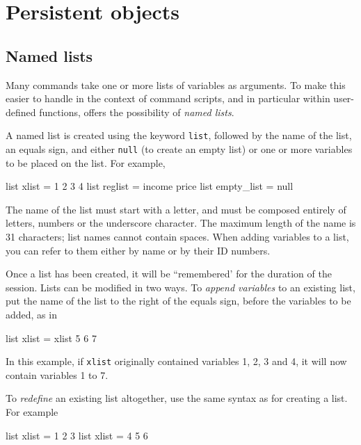 \chapter{Persistent objects}
\label{persist}


\section{Named lists}
\label{named-lists}

Many  commands take one or more lists of variables as
arguments.  To make this easier to handle in the context of command
scripts, and in particular within user-defined functions, 
offers the possibility of \textit{named lists}.  

A named list is created using the keyword \texttt{list}, followed by
the name of the list, an equals sign, and either \texttt{null} (to
create an empty list) or one or more variables to be placed on the
list.  For example,

\begin{code}
list xlist = 1 2 3 4
list reglist = income price 
list empty_list = null
\end{code}

The name of the list must start with a letter, and must be composed
entirely of letters, numbers or the underscore character.  The maximum
length of the name is 31 characters; list names cannot contain
spaces.  When adding variables to a list, you can refer to them either
by name or by their ID numbers. 

Once a list has been created, it will be ``remembered' for the
duration of the  session.  Lists can be modified in two
ways.  To \textit{append variables} to an existing list, put the name
of the list to the right of the equals sign, before the variables to
be added, as in

\begin{code}
list xlist = xlist 5 6 7
\end{code}

In this example, if \texttt{xlist} originally contained variables 1,
2, 3 and 4, it will now contain variables 1 to 7.

To \textit{redefine} an existing list altogether, use the same syntax
as for creating a list.  For example

\begin{code}
list xlist = 1 2 3
list xlist = 4 5 6
\end{code}

